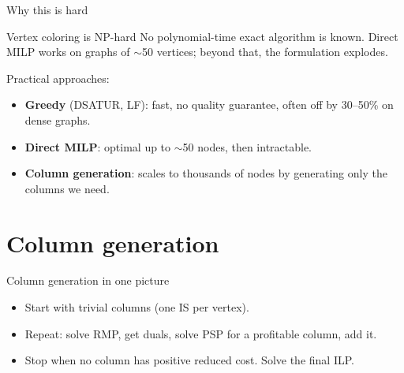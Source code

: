 \documentclass[aspectratio=169,11pt]{beamer}
\begin{document}
\begin{frame}{Why this is hard}
  \begin{block}{Vertex coloring is NP-hard}
    No polynomial-time exact algorithm is known. Direct MILP works on graphs
    of $\sim$50 vertices; beyond that, the formulation explodes.
  \end{block}

  \medskip
  Practical approaches:
  \begin{itemize}
    \item \textbf{Greedy} (DSATUR, LF): fast, no quality guarantee, often
          off by 30--50\% on dense graphs.
    \item \textbf{Direct MILP}: optimal up to $\sim$50 nodes, then intractable.
    \item \textbf{Column generation}: scales to thousands of nodes by
          generating only the columns we need.
  \end{itemize}
\end{frame}

\section{Column generation}

\begin{frame}{Column generation in one picture}
  \centering

  \medskip
  \begin{itemize}\small
    \item Start with trivial columns (one IS per vertex).
    \item Repeat: solve RMP, get duals, solve PSP for a profitable column, add it.
    \item Stop when no column has positive reduced cost. Solve the final ILP.
  \end{itemize}
\end{frame}
\end{document}
